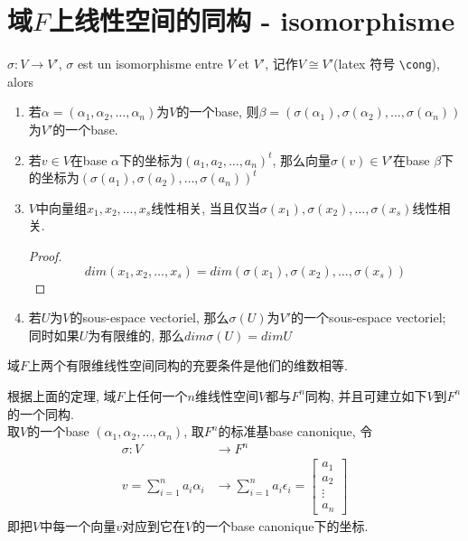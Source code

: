 \documentclass{book}
\begin{document}
\section{域$F$上线性空间的同构 - isomorphisme}
$\sigma: V \rightarrow V'$, $\sigma$ est un isomorphisme entre $V$ et $V'$, 记作$V \cong V'$(latex 符号 \verb+\cong+), alors
\begin{enumerate}
\item 若$\alpha = (\alpha_1, \alpha_2, \ldots, \alpha_n)$为$V$的一个base, 则$\beta = (\sigma(\alpha_1), \sigma(\alpha_2), \ldots, \sigma(\alpha_n))$为$V'$的一个base.
\item 若$v \in V$在base $\alpha$下的坐标为$(a_1, a_2, \ldots, a_n)^t$,
	那么向量$\sigma(v) \in V'$在base $\beta$下的坐标为$(\sigma(a_1), \sigma(a_2), \ldots, \sigma(a_n))^t$
\item $V$中向量组$x_1, x_2, \ldots, x_s$线性相关, 当且仅当$\sigma(x_1), \sigma(x_2), \ldots, \sigma(x_s)$线性相关.
	\begin{proof}
	$$dim(x_1, x_2, \ldots, x_s) = dim(\sigma(x_1), \sigma(x_2), \ldots, \sigma(x_s))$$
	\end{proof}
\item 若$U$为$V$的sous-espace vectoriel, 那么$\sigma(U)$为$V'$的一个sous-espace vectoriel;
		同时如果$U$为有限维的, 那么$dim \sigma(U) = dim U$
\end{enumerate}

\begin{theorem}[维数决定同构]
域$F$上两个有限维线性空间同构的充要条件是他们的维数相等.
\end{theorem}
根据上面的定理, 域$F$上任何一个$n$维线性空间$V$都与$F^n$同构, 并且可建立如下$V$到$F^n$的一个同构.\\
取$V$的一个base $(\alpha_1, \alpha_2, \ldots, \alpha_n)$, 取$F^n$的标准基base canonique, 令
$$
\begin{aligned}
\sigma: V & \rightarrow F^n \\
v = \sum_{i = 1}^n a_i \alpha_i & \rightarrow \sum_{i = 1}^n a_i \epsilon_i = \begin{bmatrix}a_1 \\ a_2 \\ \vdots \\ a_n \end{bmatrix}
\end{aligned}
$$
即把$V$中每一个向量$v$对应到它在$V$的一个base canonique下的坐标.
\end{document}
